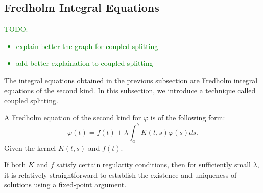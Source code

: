 \documentclass[a4paper,12pt]{article}
\begin{document}

\subsection{Fredholm Integral Equations}

\textcolor{green}{
    TODO:
    \begin{itemize}
        \item explain better the graph for coupled splitting
        \item add better explaination to coupled splitting
    \end{itemize}
}

The integral equations obtained in the previous subsection are Fredholm integral
equations of the second kind. In this subsection, we introduce a technique called
coupled splitting.


\begin{definition}
    A Fredholm equation of the second kind for $\varphi$  is of the following form:
    \begin{equation}
        \varphi(t)=f(t)+\lambda \int_a^b K(t, s) \varphi(s) ds.
    \end{equation}
    Given the kernel  $K(t, s)$  and  $ f(t)$.
\end{definition}

If both $K$ and $f$ satisfy certain regularity conditions, then for sufficiently
small $\lambda$, it is relatively straightforward to establish the existence
and uniqueness of solutions using a fixed-point argument.

\end{document}
